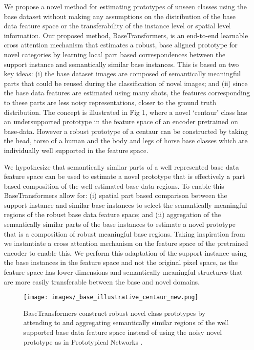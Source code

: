 \documentclass{bmvc2k}
\begin{document}
We propose a novel method for estimating prototypes of unseen classes using the base dataset without making any assumptions on the distribution of the base data feature space or the transferability of the instance level or spatial level information. Our proposed method, BaseTransformers, is an end-to-end learnable cross attention mechanism that estimates a robust, base aligned prototype for novel categories by learning local part based correspondences between the support instance and semantically similar base instances. This is based on two key ideas: (i) the base dataset images are composed of semantically meaningful parts that could be reused during the classification of novel images; and (ii) since the base data features are estimated using many shots, the features corresponding to these parts are less noisy representations, closer to the ground truth distribution. The concept is illustrated in  Fig 1, where a novel `centaur' class  has an undersupported prototype in the feature space of an encoder pretrained on base-data. However a robust prototype of a centaur can be constructed by taking the head, torso of a human and the body and legs of horse base classes which are individually well supported in the feature space. 

We hypothesize that semantically similar parts of a well represented base data feature space can be used to estimate a novel prototype that is effectively a part based composition of the well estimated base data regions. To enable this BaseTransformers allow for: (i) spatial part based comparison between the support instance and similar base instances to select the semantically meaningful regions of the robust base data feature space; and (ii) aggregation of the semantically similar parts of the base instances to estimate a novel prototype that is a composition of robust meaningful base regions. Taking inspiration from \cite{doersch2020crosstransformers} we instantiate a cross attention mechanism on the feature space of the pretrained encoder to enable this. We perform this adaptation of the support instance using the base instances in the feature space and not the original pixel space, as the feature space has lower dimensions and  semantically meaningful structures that are more easily transferable between the base and novel domains.

\begin{figure}
\centering
\texttt{[image: images/\_base\_illustrative\_centaur\_new.png]}
\caption{BaseTransformers construct robust novel class prototypes by attending to and aggregating semantically similar regions of the well supported base data feature space instead of using the noisy novel prototype as in Prototypical Networks \cite{snell2017prototypical}.}
\label{fig:illustrative}
\end{figure}
\end{document}
